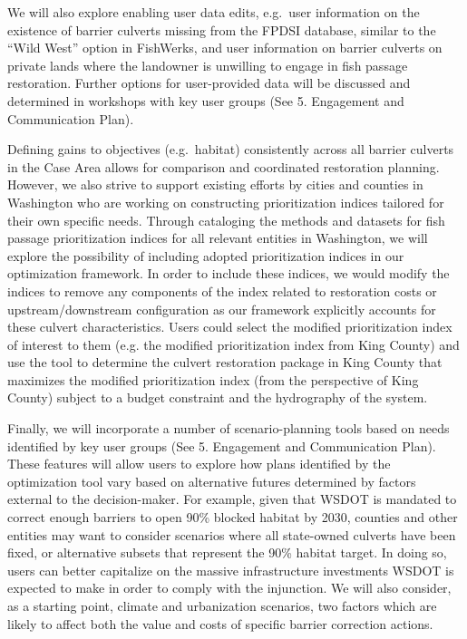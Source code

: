 We will also explore enabling user data edits, e.g.\ user information on the existence of barrier culverts missing from the FPDSI database, similar to the ``Wild West'' option in FishWerks, and user information on barrier culverts on private lands where the landowner is unwilling to engage in fish passage restoration. Further options for user-provided data will be discussed and determined in workshops with key user groups (See 5. Engagement and Communication Plan).

Defining gains to objectives (e.g.\ habitat) consistently across all barrier culverts in the Case Area allows for comparison and coordinated restoration planning. However, we also strive to support existing efforts by cities and counties in Washington who are working on constructing prioritization indices tailored for their own specific needs. Through cataloging the methods and datasets for fish passage prioritization indices for all relevant entities in Washington, we will explore the possibility of including adopted prioritization indices in our optimization framework. In order to include these indices, we would modify the indices to remove any components of the index related to restoration costs or upstream/downstream configuration as our framework explicitly accounts for these culvert characteristics. Users could select the modified prioritization index of interest to them (e.g. the modified prioritization index from King County) and use the tool to determine the culvert restoration package in King County that maximizes the modified prioritization index (from the perspective of King County) subject to a budget constraint and the hydrography of the system.

Finally, we will incorporate a number of scenario-planning tools based on needs identified by key user groups (See 5. Engagement and Communication Plan). These features will allow users to explore how plans identified by the optimization tool vary based on alternative futures determined by factors external to the decision-maker. For example, given that WSDOT is mandated to correct enough barriers to open 90\% blocked habitat by 2030, counties and other entities may want to consider scenarios where all state-owned culverts have been fixed, or alternative subsets that represent the 90\% habitat target. In doing so, users can better capitalize on the massive infrastructure investments WSDOT is expected to make in order to comply with the injunction. We will also consider, as a starting point, climate and urbanization scenarios, two factors which are likely to affect both the value and costs of specific barrier correction actions.
  
